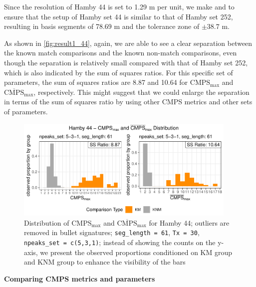 Since the resolution of Hamby 44 is set to 1.29 \textmu m per unit, we
make  and  to ensure that the setup
of Hamby set 44 is similar to that of Hamby set 252, resulting in basis
segments of 78.69 \textmu m and the tolerance zone of \(\pm 38.7\)
\textmu m.

As shown in \autoref{fig:result1_44}, again, we are able to see a clear
separation between the known match comparisons and the known non-match
comparisons, even though the separation is relatively small compared
with that of Hamby set 252, which is also indicated by the sum of
squares ratios. For this specific set of parameters, the sum of squares
ratios are 8.87 and 10.64 for \(\mathrm{CMPS_{max}}\) and
\(\mathrm{\overline{CMPS}_{max}}\), respectively. This might suggest
that we could enlarge the separation in terms of the sum of squares
ratio by using other CMPS metrics and other sets of parameters.

\begin{Schunk}
\begin{figure}

{\centering \includegraphics[width=400px]{ju-hofmann_files/figure-latex/result1_44-1} 

}

\caption{Distribution of $\mathrm{CMPS_{max}}$ and $\mathrm{\overline{CMPS}_{max}}$ for Hamby 44; outliers are removed in bullet signatures; \texttt{seg\_length = 61}, \texttt{Tx = 30}, \texttt{npeaks\_set = c(5,3,1)}; instead of showing the counts on the y-axis, we present the observed proportions conditioned on KM group and KNM group to enhance the visibility of the bars }\label{fig:result1_44}
\end{figure}
\end{Schunk}

\textbf{Comparing CMPS metrics and parameters}

